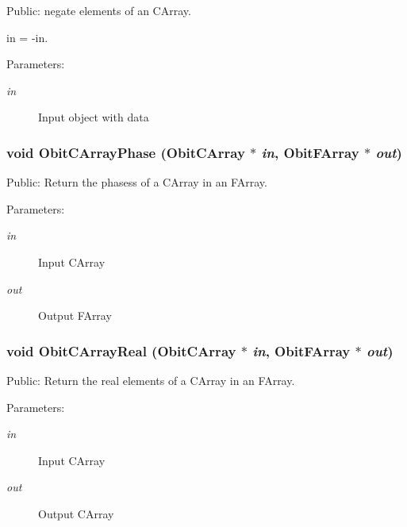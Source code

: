 Public: negate elements of an CArray. 

in = -in. \begin{Desc}
\item[Parameters:]
\begin{description}
\item[{\em in}]Input object with data \end{description}
\end{Desc}
\subsubsection{\setlength{\rightskip}{0pt plus 5cm}void Obit\-CArray\-Phase ({\bf Obit\-CArray} $\ast$ {\em in}, {\bf Obit\-FArray} $\ast$ {\em out})}\label{ObitCArray_8h_a67}


Public: Return the phasess of a CArray in an FArray. 

\begin{Desc}
\item[Parameters:]
\begin{description}
\item[{\em in}]Input CArray \item[{\em out}]Output FArray \end{description}
\end{Desc}
\subsubsection{\setlength{\rightskip}{0pt plus 5cm}void Obit\-CArray\-Real ({\bf Obit\-CArray} $\ast$ {\em in}, {\bf Obit\-FArray} $\ast$ {\em out})}\label{ObitCArray_8h_a64}


Public: Return the real elements of a CArray in an FArray. 

\begin{Desc}
\item[Parameters:]
\begin{description}
\item[{\em in}]Input CArray \item[{\em out}]Output CArray \end{description}
\end{Desc}
